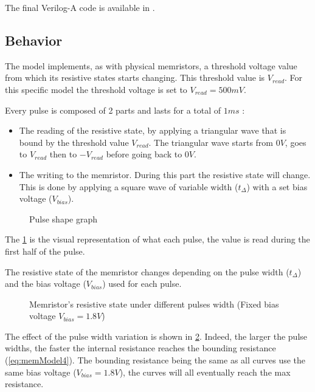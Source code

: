 The final Verilog-A code is available in \cite{memCadenceModel}.

\subsection{Behavior}\label{subsec:memModelBehave}

The model implements, as with physical memristors, a threshold voltage value from which its resistive states starts changing. This threshold value is $V_{read}$. For this specific model the threshold voltage is set to $V_{read}=500mV$.

Every pulse is composed of 2 parts and lasts for a total of $1 ms$ :
\begin{itemize}
  \item The reading of the resistive state, by applying a triangular wave that is bound by the threshold value $V_{read}$. The triangular wave starts from $0V$, goes to $V_{read}$ then to $-V_{read}$ before going back to $0V$.
  \item The writing to the memristor. During this part the resistive state will change. This is done by applying a square wave of variable width ($t_{\Delta}$) with a set bias voltage ($V_{bias}$).
\end{itemize}

\begin{figure}[H]
  \centering
  
  \caption{Pulse shape graph}
  \label{graph:memInput}
\end{figure}

The \cref{graph:memInput} is the visual representation of what each pulse, the value is read during the first half of the pulse.

The resistive state of the memristor changes depending on the pulse width ($t_{\Delta}$) and the bias voltage ($V_{bias}$) used for each pulse.

\begin{figure}[H]
  \centering
  
  \caption{Memristor's resistive state under different pulses width (Fixed bias voltage $V_{bias}=1.8V$)}
  \label{graph:pulseChange}
\end{figure}

The effect of the pulse width variation is shown in \cref{graph:pulseChange}. Indeed, the larger the pulse widths, the faster the internal resistance reaches the bounding resistance (\cref{eq:memModel4}). The bounding resistance being the same as all curves use the same bias voltage ($V_{bias}=1.8V$), the curves will all eventually reach the max resistance.

